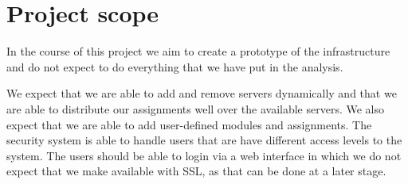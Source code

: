 \chapter{Project scope}
In the course of this project we aim to create a prototype of the infrastructure
and do not expect to do everything that we have put in the analysis.

We expect that we are able to add and remove servers dynamically and that we
are able to distribute our assignments well over the available servers. We also
expect that we are able to add user-defined modules and assignments.
The security system is able to handle users that are have different access
levels to the system. The users should be able to login via a web interface in
which we do not expect that we make available with SSL, as that can be done at a
later stage.
